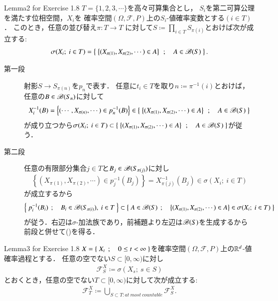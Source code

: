 \begin{itembox}[l]{Lemma2 for Exercise 1.8}
	$T = \{1,2,3,\cdots\}$を高々可算集合とし，
	$S_i$を第二可算公理を満たす位相空間，$X_i$を
	確率空間$(\Omega,\mathscr{F},P)$上の$S_i$-値確率変数とする$(i \in T)$．
	このとき，任意の並び替え$\pi:T \longrightarrow T$
	に対して$S \coloneqq \prod_{i \in T} S_{\pi(i)}$とおけば次が成立する:
	\begin{align}
		\sigma(X_i;\ i \in T) = \left\{\ \left\{ (X_{\pi(1)},X_{\pi(2)},\cdots) \in A \right\}\ \, ; \quad A \in \mathscr{B}(S)\ \right\}.
		\label{eq:lem2_for_chap_1_exercise_1_8_1}
	\end{align}
\end{itembox}

\begin{prf}\mbox{}
	\begin{description}
		\item[第一段]
			射影$S \longrightarrow S_{\pi(n)}$を$p_n$で表す．
			任意に$t_i \in T$を取り$n \coloneqq \pi^{-1}(i)$とおけば，
			任意の$B \in \mathscr{B}(S_n)$に対して
			\begin{align}
				X_i^{-1}(B) = \left\{ (\cdots, X_{\pi(n)},\cdots) \in p_n^{-1}(B) \right\} \in \left\{\ \left\{ (X_{\pi(1)}, X_{\pi(2)},\cdots) \in A \right\}\ \, ; \quad A \in \mathscr{B}(S)\ \right\}
			\end{align}
			が成り立つから$\sigma(X_i;\ i \in T) \subset 
			\left\{\ \left\{ (X_{\pi(1)}, X_{\pi(2)},\cdots) \in A \right\}\ \, ; \quad A \in \mathscr{B}(S)\ \right\}$が従う．
		
		\item[第二段]
			任意の有限部分集合$j \in T$と$B_j \in \mathscr{B}(S_{\pi(j)})$に対し
			\begin{align}
				\left\{ (X_{\pi(1)}, X_{\pi(2)},\cdots) \in p_j^{-1}(B_j) \right\}
				= X_{\pi(j)}^{-1}(B_j)
				\in \sigma(X_i;\ i \in T)
			\end{align}
			が成立するから
			\begin{align}
				\left\{\ p_i^{-1}(B_i)\ \, ; \quad B_i \in \mathscr{B}(S_{\pi(i)}),\ i \in T\ \right\}
				\subset \left\{\ A \in \mathscr{B}(S)\ \, ; \quad \left\{ (X_{\pi(1)}, X_{\pi(2)},\cdots) \in A \right\} \in \sigma(X_i;\ i \in T)\ \right\}
			\end{align}
			が従う．右辺は$\sigma$-加法族であり，前補題より左辺は$\mathscr{B}(S)$を生成するから
			前段と併せて()を得る．
			\QED
	\end{description}
\end{prf}

\begin{itembox}[l]{Lemma3 for Exercise 1.8}
	$X = \left\{\ X_t\ \, ; \quad 0 \leq t < \infty\ \right\}$を確率空間$(\Omega,\mathscr{F},P)$上の$\mathbb{R}^d$-値確率過程とする．
	任意の空でない$S \subset [0,\infty)$に対し
	\begin{align}
		\mathcal{F}^X_S \coloneqq \sigma(X_s;\ s \in S)
	\end{align}
	とおくとき，任意の空でない$T \subset [0,\infty)$に対して次が成立する:
	\begin{align}
		\mathcal{F}^X_T \coloneqq \bigcup_{S \subset T:at\ most\ countable} \mathcal{F}^X_S.
		\label{eq:lem3_for_chap_1_exercise_1_8_1}
	\end{align}
\end{itembox}

